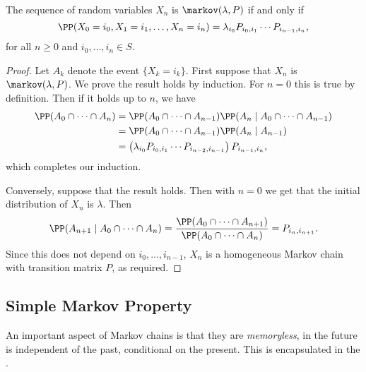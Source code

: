 \documentclass[a4paper]{scrartcl}
\begin{document}
\begin{theorem}
	The sequence of random variables $X_n$ is $\markov(\lambda, P)$ if and only if
	$$
	\PP(X_0 = i_0, X_1 = i_1, \dots, X_n = i_n) = \lambda_{i_0}P_{i_0, i_1} \cdots P_{i_{n - 1}, i_n},
	$$
	for all $n \geq 0$ and $i_0, \dots, i_n \in S$.
\end{theorem}
\begin{proof}
	Let $A_k$ denote the event $\{X_k = i_k\}$. First suppose that $X_n$ is $\markov(\lambda, P)$. We prove the result holds by induction. For $n = 0$ this is true by definition. Then if it holds up to $n$, we have
	\begin{align*}
	\PP(A_0 \cap \cdots \cap A_n)  &= \PP(A_0 \cap \cdots \cap A_{n - 1})\PP(A_n \mid A_0 \cap \cdots \cap A_{n - 1}) \\
	&= \PP(A_0 \cap \cdots \cap A_{n - 1})\PP(A_n \mid A_{n - 1}) \\ 
	&= \left(\lambda_{i_0}P_{i_0, i_1} \cdots P_{i_{n - 2}, i_{n - 1}}\right)P_{i_{n - 1}, i_n},
\end{align*}
which completes our induction.

Conversely, suppose that the result holds. Then with $n = 0$ we get that the initial distribution of $X_n$ is $\lambda$. Then
$$
\PP(A_{n + 1} \mid A_{0} \cap \cdots \cap A_n) = \frac{\PP(A_0 \cap \cdots \cap A_{n + 1})}{\PP(A_0 \cap \cdots \cap A_{n})} = P_{i_{n}, i_{n + 1}}.
$$
Since this does not depend on $i_0, \dots, i_{n - 1}$, $X_n$ is a homogeneous Markov chain with transition matrix $P$, as required.
\end{proof}

\subsection{Simple Markov Property}

An important aspect of Markov chains is that they are \emph{memoryless}, in the future is independent of the past, conditional on the present. This is encapsulated in the .
\end{document}
